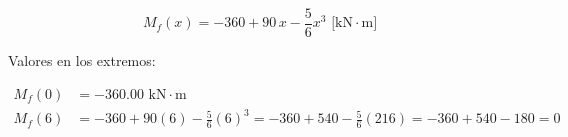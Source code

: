 \begin{itemize}
\begin{equation}
              \boxed{M_f(x) = -360 + 90\,x - \frac{5}{6}x^3\text{ [kN}\cdot\text{m]}}

          \end{equation}

          Valores en los extremos:

          \begin{align*}

              M_f(0) & = -360.00\text{ kN}\cdot\text{m}                                                         \\

              M_f(6) & = -360 + 90(6) - \frac{5}{6}(6)^3 = -360 + 540 - \frac{5}{6}(216) = -360 + 540 - 180 = 0

          \end{align*}

\end{itemize}




